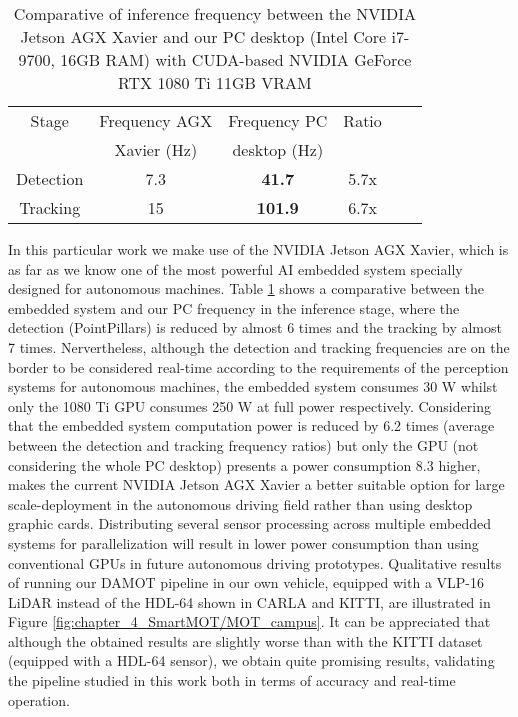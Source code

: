 \begin{table}[h]
	\caption{Comparative of inference frequency between the NVIDIA Jetson AGX Xavier and our PC desktop (Intel Core i7-9700, 16GB RAM) with CUDA-based NVIDIA GeForce RTX 1080 Ti 11GB VRAM}
	\label{table:xavier_vs_computer_hz}
	\begin{center}
		\begin{tabular}{|c|c|c|c|c|c|}
			\hline
			Stage & Frequency AGX &  Frequency PC & Ratio \\
			& Xavier (Hz) & desktop (Hz) & \\
			\hline
			Detection & 7.3 & \bf{41.7} & 5.7x \\
			\hline
			Tracking & 15 & \bf{101.9} & 6.7x \\
			\hline
		\end{tabular}
	\end{center}
\end{table}

In this particular work we make use of the NVIDIA Jetson AGX Xavier, which is as far as we know one of the most powerful AI embedded system specially designed for autonomous machines. Table \ref{table:xavier_vs_computer_hz} shows a comparative between the embedded system and our PC frequency in the inference stage, where the detection (PointPillars) is reduced by almost 6 times and the tracking by almost 7 times. Nervertheless, although the detection and tracking frequencies are on the border to be considered real-time according to the requirements of the perception systems for autonomous machines, the embedded system consumes 30 W whilst only the 1080 Ti GPU consumes 250 W at full power respectively. Considering that the embedded system computation power is reduced by 6.2 times (average between the detection and tracking frequency ratios) but only the GPU (not considering the whole PC desktop) presents a power consumption 8.3 higher, makes the current NVIDIA Jetson AGX Xavier a better suitable option for large scale-deployment in the autonomous driving field rather than using desktop graphic cards. Distributing several sensor processing across multiple embedded systems for parallelization will result in lower power consumption than using conventional GPUs in future autonomous driving prototypes. Qualitative results of running our DAMOT pipeline in our own vehicle, equipped with a VLP-16 LiDAR instead of the HDL-64 shown in CARLA and KITTI, are illustrated in Figure \ref{fig:chapter_4_SmartMOT/MOT_campus}. It can be appreciated that although the obtained results are slightly worse than with the KITTI dataset (equipped with a HDL-64 sensor), we obtain quite promising results, validating the pipeline studied in this work both in terms of accuracy and real-time operation.

